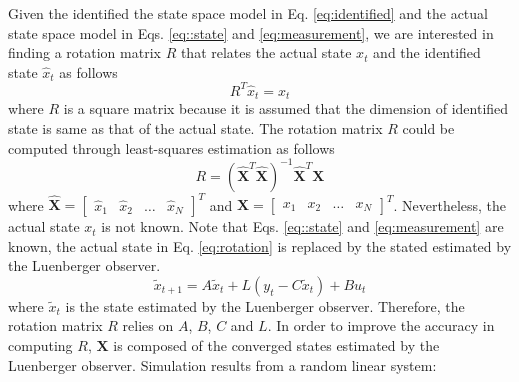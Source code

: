 \documentclass[12pt]{article}
\begin{document}
Given the identified the state space model in Eq. \ref{eq:identified} and the actual state space model in Eqs. \ref{eq::state} and \ref{eq:measurement}, we are interested in finding a rotation matrix $R$ that relates the actual state $x_t$ and the identified state $\hat{x}_t$ as follows 
\begin{equation}
R^T\hat{x}_t=x_t
\end{equation}
where $R$ is a square matrix because it is assumed that the dimension of identified state is same as that of the actual state. The rotation matrix $R$ could be computed through least-squares estimation as follows
\begin{equation}\label{eq:rotation}
R=(\hat{\mathbf{X}}^T\hat{\mathbf{X}})^{-1}\hat{\mathbf{X}}^T\mathbf{X}
\end{equation}
where $\hat{\mathbf{X}}= \begin{bmatrix} \hat{x}_1 & \hat{x}_2 &\ldots &\hat{x}_N \end{bmatrix}^T$ and $\mathbf{X} = \begin{bmatrix} x_1 & x_2 & \ldots & x_N \end{bmatrix}^T$. Nevertheless, the actual state $x_t$ is not known. Note that Eqs. \ref{eq::state} and \ref{eq:measurement} are known, the actual state in Eq. \ref{eq:rotation} is replaced by the stated estimated by the Luenberger observer.
\begin{equation}
\tilde{x}_{t+1}=A\tilde{x}_t+L(y_t-C\tilde{x}_t)+Bu_t
\end{equation}
where $\tilde{x}_t$ is the state estimated by the Luenberger observer. Therefore, the rotation matrix $R$ relies on $A$, $B$, $C$ and $L$. In order to improve the accuracy in computing $R$, $\mathbf{X}$ is composed of the converged states estimated by the Luenberger observer.
Simulation results from a random linear system:
\end{document}
